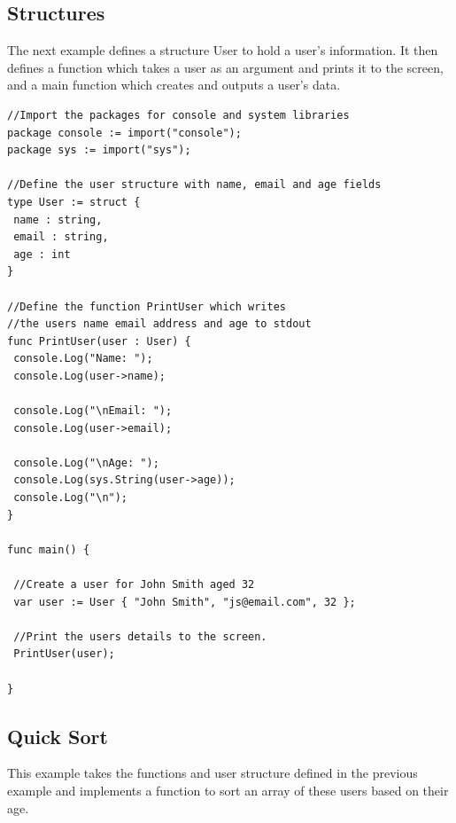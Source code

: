 \documentclass[]{final_report}
\begin{document}
\subsection{Structures}

The next example defines a structure User to hold a user's information. It then defines a function which takes a user as an argument and prints it to the screen, and a main function which creates and outputs a user's data.

\begin{verbatim}
//Import the packages for console and system libraries
package console := import("console");
package sys := import("sys");

//Define the user structure with name, email and age fields
type User := struct {
 name : string,
 email : string,
 age : int
}

//Define the function PrintUser which writes 
//the users name email address and age to stdout
func PrintUser(user : User) {
 console.Log("Name: ");
 console.Log(user->name);
 
 console.Log("\nEmail: ");
 console.Log(user->email);
 
 console.Log("\nAge: ");
 console.Log(sys.String(user->age));
 console.Log("\n");
}

func main() {
 
 //Create a user for John Smith aged 32
 var user := User { "John Smith", "js@email.com", 32 };

 //Print the users details to the screen.
 PrintUser(user);

}
\end{verbatim}

\subsection{Quick Sort}

This example takes the functions and user structure defined in the previous example and implements a function to sort an array of these users based on their age.
\end{document}
